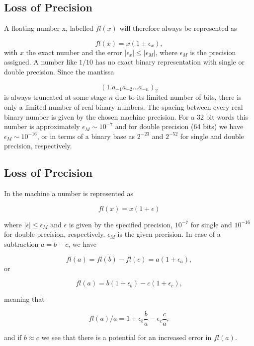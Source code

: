 \documentclass[%
twoside,                 %
final,                   %
10pt]{article}
\newenvironment{block_mdfboxadmon}[1][]{
\begin{block_mdfboxmdframed}[frametitle=#1]
}
{
\end{block_mdfboxmdframed}
}
\begin{document}
\subsection{Loss of Precision}


\begin{block_mdfboxadmon}
A floating number x, labelled $fl(x)$ will therefore always be represented as

\begin{equation}
  fl(x) = x(1\pm \epsilon_x),
\end{equation}
with $x$ the exact number and the error $|\epsilon_x| \le |\epsilon_M|$, where
$\epsilon_M$ is the precision assigned. A number like $1/10$ has no exact binary representation
with single or double precision. Since the mantissa

\[
\left(1.a_{-1}a_{-2}\dots a_{-n}\right)_2
\]
is always truncated at some stage $n$ due to its limited number of bits, there is only a
limited number of real binary numbers. The spacing between every real binary number is given by the
chosen machine precision.
For a 32 bit words this number is approximately
$ \epsilon_M \sim 10^{-7}$ and for double precision (64 bits) we have
$ \epsilon_M \sim 10^{-16}$, or in terms of a binary base
as $2^{-23}$ and $2^{-52}$ for single and double precision, respectively.
\end{block_mdfboxadmon}



\subsection{Loss of Precision}


\begin{block_mdfboxadmon}
In the machine a number is represented as

\begin{equation}
  fl(x)= x(1+\epsilon)
\end{equation}

where $|\epsilon| \leq \epsilon_M$ and $\epsilon$ is given by the
specified precision, $10^{-7}$ for single and $10^{-16}$ for double
precision, respectively.
$\epsilon_M$ is the given precision.
In case of a subtraction $a=b-c$, we have

\begin{equation}
   fl(a)=fl(b)-fl(c) = a(1+\epsilon_a),
\end{equation}
or

\begin{equation}
   fl(a)=b(1+\epsilon_b)-c(1+\epsilon_c),
\end{equation}

meaning that

\begin{equation}
   fl(a)/a=1+\epsilon_b\frac{b}{a}- \epsilon_c\frac{c}{a},
\end{equation}

and if $b\approx c$ we see that there is a potential for an increased
error in $fl(a)$.
\end{block_mdfboxadmon}
\end{document}

